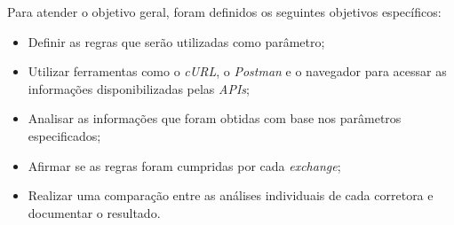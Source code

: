 Para atender o objetivo geral, foram definidos os seguintes objetivos específicos:

\begin{itemize}
	\item Definir as regras que serão utilizadas como parâmetro;
	\item Utilizar ferramentas como o \textit{cURL}, o \textit{Postman} e o navegador para acessar as informações disponibilizadas pelas \textit{APIs};
	\item Analisar as informações que foram obtidas com base nos parâmetros especificados;
	\item Afirmar se as regras foram cumpridas por cada \textit{exchange};
	\item Realizar uma comparação entre as análises individuais de cada corretora e documentar o resultado.
\end{itemize}
